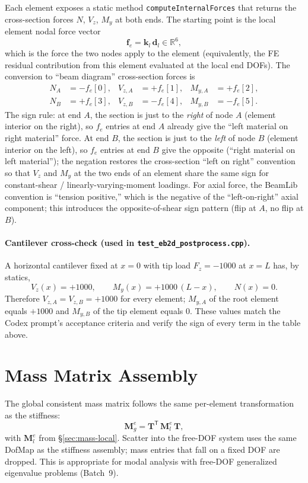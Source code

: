 \documentclass[11pt,a4paper]{article}
\newcommand{\bmath}[1]{\boldsymbol{#1}}
\begin{document}
Each element exposes a static method \texttt{computeInternalForces} that returns the cross-section forces $N$, $V_z$, $M_y$ at both ends. The starting point is the local element nodal force vector
\[
\bmath{f}_e = \bmath{k}_l\,\bmath{d}_l \in \mathbb{R}^6,
\]
which is the force the two nodes apply to the element (equivalently, the FE residual contribution from this element evaluated at the local end DOFs). The conversion to ``beam diagram'' cross-section forces is
\[
\boxed{\;\begin{aligned}
N_A &= -f_e[0], & V_{z,A} &= +f_e[1], & M_{y,A} &= +f_e[2], \\
N_B &= +f_e[3], & V_{z,B} &= -f_e[4], & M_{y,B} &= -f_e[5].
\end{aligned}\;}
\]
The sign rule: at end $A$, the section is just to the \emph{right} of node $A$ (element interior on the right), so $f_e$ entries at end $A$ already give the ``left material on right material'' force. At end $B$, the section is just to the \emph{left} of node $B$ (element interior on the left), so $f_e$ entries at end $B$ give the opposite (``right material on left material''); the negation restores the cross-section ``left on right'' convention so that $V_z$ and $M_y$ at the two ends of an element share the same sign for constant-shear / linearly-varying-moment loadings. For axial force, the BeamLib convention is ``tension positive,'' which is the negative of the ``left-on-right'' axial component; this introduces the opposite-of-shear sign pattern (flip at $A$, no flip at $B$).

\paragraph{Cantilever cross-check (used in \texttt{test\_eb2d\_postprocess.cpp}).}
A horizontal cantilever fixed at $x=0$ with tip load $F_z = -1000$ at $x=L$ has, by statics,
\[
V_z(x) = +1000, \qquad M_y(x) = +1000\,(L - x), \qquad N(x) = 0.
\]
Therefore $V_{z,A} = V_{z,B} = +1000$ for every element; $M_{y,A}$ of the root element equals $+1000$ and $M_{y,B}$ of the tip element equals $0$. These values match the Codex prompt's acceptance criteria and verify the sign of every term in the table above.

\section{Mass Matrix Assembly}\label{sec:mass-assembly}

The global consistent mass matrix follows the same per-element transformation as the stiffness:
\[
\bmath{M}_g^e = \bmath{T}^\mathsf{T}\,\bmath{M}_l^e\,\bmath{T},
\]
with $\bmath{M}_l^e$ from \S\ref{sec:mass-local}. Scatter into the free-DOF system uses the same DofMap as the stiffness assembly; mass entries that fall on a fixed DOF are dropped. This is appropriate for modal analysis with free-DOF generalized eigenvalue problems (Batch~9).
\end{document}
